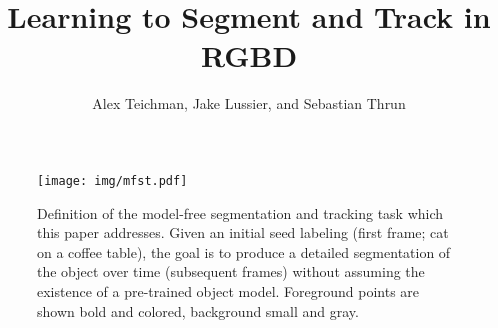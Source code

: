 \documentclass[graybox]{svmult}
\begin{document}
\title*{Learning to Segment and Track in RGBD}
\author{Alex Teichman, Jake Lussier, and Sebastian Thrun}

\maketitle


\begin{figure}
  \centering
  \texttt{[image: img/mfst.pdf]}
  \caption{Definition of the model-free segmentation and tracking task which this paper addresses.  Given an initial seed labeling (first frame; cat on a coffee table), the goal is to produce a detailed segmentation of the object over time (subsequent frames) without assuming the existence of a pre-trained object model.  Foreground points are shown bold and colored, background small and gray.}
  \label{fig:goal}
\end{figure}

\newcommand{\thisabs}{
We consider the problem of segmenting and tracking deformable objects in color video with depth (RGBD) data available from commodity sensors such as the Kinect.  We frame this problem with very few assumptions - no prior object model, no stationary sensor, no prior 3D map - thus making a solution potentially useful for a large number of applications, including semi-supervised learning, 3D model capture, and object recognition.

Our approach makes use of a rich feature set, including local image appearance, depth discontinuities, optical flow, and surface normals to inform the segmentation decision in a conditional random field model.  In contrast to previous work in this field, the proposed method \emph{learns} how to best make use of these features from ground-truth segmented sequences.  We provide qualitative and quantitative analyses which demonstrate substantial improvement over the state of the art.

This paper is an extended version of our previous work \cite{teichman2012a}.  Building on this, we show that it is possible to achieve an order of magnitude speedup and thus real-time performance (~15FPS) by applying simple algorithmic optimizations to the original work.  This speedup comes at only a minor cost in overall accuracy and thus makes this approach applicable to interactive uses rather than offline only.  Finally, we demonstrate one possible use in efficiently collecting training data for an off-the-shelf object detector.

}
\end{document}
